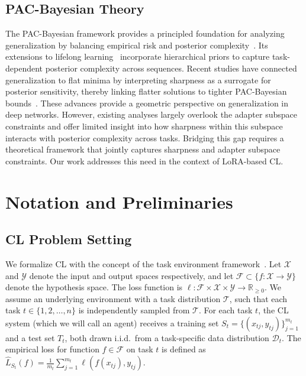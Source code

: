 \documentclass[letterpaper]{article} %
\begin{document}
\subsection{PAC-Bayesian Theory}


The PAC-Bayesian framework provides a principled foundation for analyzing generalization by balancing empirical risk and posterior complexity~\cite{mcallesterPACBayesianStochasticModel2003,pentinaPACBayesianBoundLifelong2014,germainPACBayesianTheoryMeets2016,lotfiPACBayesCompressionBounds2022}. Its extensions to lifelong learning~\cite{pentinaPACBayesianBoundLifelong2014} incorporate hierarchical priors to capture task-dependent posterior complexity across sequences.
Recent studies have connected generalization to flat minima by interpreting sharpness as a surrogate for posterior sensitivity, thereby linking flatter solutions to tighter PAC-Bayesian bounds~\cite{NIPS2017_10ce03a1,jiang2019fantasticgeneralizationmeasures,mllenhoff2023sam}. These advances provide a geometric perspective on generalization in deep networks. However, existing analyses largely overlook the adapter subspace constraints and offer limited insight into how sharpness within this subspace interacts with posterior complexity across tasks. Bridging this gap requires a theoretical framework that jointly captures sharpness and adapter subspace constraints. Our work addresses this need in the context of LoRA-based CL.


\section{Notation and Preliminaries}

\subsection{CL Problem Setting }

We formalize CL with the concept of the task environment framework~\cite{baxter2000model,pentinaPACBayesianBoundLifelong2014}. Let $\mathcal{X}$ and $\mathcal{Y}$ denote the input and output spaces respectively, and let $\mathcal{F} \subset \{f : \mathcal{X} \rightarrow \mathcal{Y}\}$ denote the hypothesis space. The loss function is $\ell : \mathcal{F} \times \mathcal{X} \times \mathcal{Y} \rightarrow \mathbb{R}_{\geq 0}$. We assume an underlying environment with a task distribution $\mathcal{T}$, such that each task $t \in \{1, 2, \ldots, n\}$ is independently sampled from $\mathcal{T}$. For each task $t$, the CL system (which we will call an agent) receives a training set $S_t = \{(x_{tj}, y_{tj})\}_{j=1}^{m_t}$ and a test set $T_t$, both drawn i.i.d.\ from a task-specific data distribution $\mathcal{D}_t$. The empirical loss for function $f \in \mathcal{F}$ on task $t$ is defined as
$
\hat{L}_{S_t}(f) = \frac{1}{m_t} \sum_{j=1}^{m_t} \ell(f(x_{tj}), y_{tj}).
$
\end{document}
